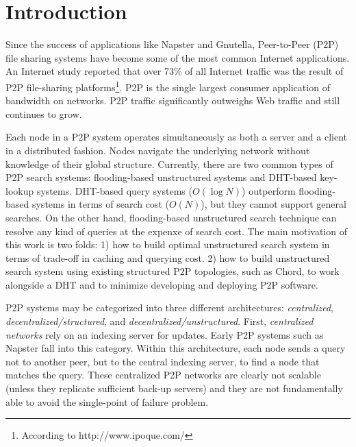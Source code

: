 \documentclass[conference]{IEEEtran}
\begin{document}
\section{Introduction}\label{sec:introduction} 
Since the success of applications like 
Napster and Gnutella,
Peer-to-Peer (P2P) file sharing systems have become some of the most
common Internet applications. An Internet study reported
that over 73\% of all Internet traffic was 
the result of P2P file-sharing platforms\footnote{According 
to http://www.ipoque.com/}.
P2P is the single largest consumer application of bandwidth on 
networks. P2P traffic significantly outweighs Web traffic 
and still continues to grow\cite{Goth06b}.

Each node in a P2P system operates simultaneously as both a server and a client
in a distributed fashion. Nodes navigate the
underlying network without knowledge of their global structure. 
Currently, there are two common types of P2P search systems: flooding-based
unstructured systems and DHT-based key-lookup systems. 
DHT-based query systems ($O(\log N)$) outperform flooding-based systems in terms of 
search cost ($O(N)$), but they cannot support general searches.
On the other hand, flooding-based unstructured search technique can resolve 
any kind of queries at the expenxe of search cost.
The main motivation of this work is two folds: 
1) how to build optimal unstructured search system in terms of 
trade-off in caching and querying cost. 
2) how to build unstructured search system using existing structured
P2P topologies, such as Chord, to work alongside a DHT and 
to minimize developing and deploying P2P software. 

\iffalse
P2P systems may be categorized into three
different architectures: \emph{centralized},
\emph{decentralized/structured}, and
\emph{decentralized/unstructured}\cite{LCKS02}. 
First, \emph{centralized networks} rely on an indexing server for updates.
Early P2P systems such as Napster 
fall into this category. Within this architecture, each node sends
a query not to another peer, but to the central indexing server, to find
a node that matches the query. These centralized P2P
networks are clearly not scalable (unless they replicate sufficient back-up
servers) and they are not fundamentally
able to avoid the single-point of failure problem.
\end{document}
